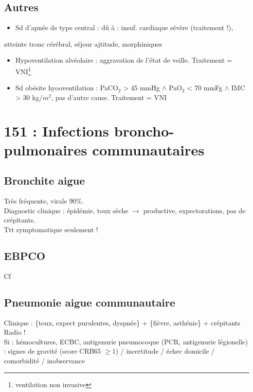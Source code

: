 \documentclass{article}
\begin{document}
\subsection{Autres}
\begin{itemize}
  \item Sd d'apnée de type central : dû à : insuf. cardiaque sévère (traitement !),
\end{itemize}
atteinte tronc cérébral, séjour ajtitude, morphiniques
\begin{itemize}
  \item Hypoventilation alvéolaire : aggravation de l'état de veille. Traitement =
    VNI\footnote{ventilation non invasive}
  \item Sd obésite hyooventilation :  PaCO\(_{\text{2}}\) > 45 mmHg \(\wedge\) PaO\(_{\text{2}}\) < 70 mmFg \(\wedge\)
    IMC > 30 kg/\(m^2\), pas d'autre cause. Traitement = VNI
\end{itemize}

\section{151 : Infections broncho-pulmonaires communautaires}
\subsection{Bronchite aigue}
Très fréquente, virale 90\%. \\
Diagnostic clinique : épidémie, toux sèche \(\to\) productive, expectorations,
pas de crépitants.\\
Ttt symptomatique seulement !

\subsection{EBPCO} Cf~

\subsection{Pneumonie aigue communautaire}
Clinique : \{toux, expect purulentes, dyspnée\} + \{fièvre, asthénie\} +
crépitants\\
Radio !\\
Si \faHospitalO : hémocultures, ECBC, antigenurie pneumocoque (PCR,
antigenurie légionelle)\\
\faHospitalO : signes de gravité (score CRB65 \(\ge 1\)) / incertitude / échec domicile / comorbidité / inobservance
\end{document}
